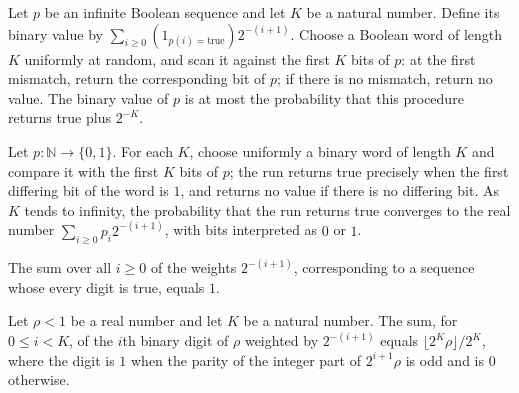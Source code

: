 \begin{theorem}
\label{Randomized.binVal_le_randProb_rhoCoinRun_add}
\leanok
{}
Let $p$ be an infinite Boolean sequence and let $K$ be a natural number. Define its
binary value by $\sum_{i\ge0}(1_{p(i)=\mathrm{true}})2^{-(i+1)}$. Choose a Boolean word
of length $K$ uniformly at random, and scan it against the first $K$ bits of $p$: at the
first mismatch, return the corresponding bit of $p$; if there is no mismatch, return no
value. The binary value of $p$ is at most the probability that this procedure returns
true plus $2^{-K}$.
\end{theorem}

\begin{theorem}
\label{Randomized.tendsto_randProb_rhoCoinRun}
\leanok
{}
Let $p:\mathbb{N}\to\{0,1\}$. For each $K$, choose uniformly a binary word of length $K$
and compare it with the first $K$ bits of $p$; the run returns true precisely when the
first differing bit of the word is $1$, and returns no value if there is no differing
bit. As $K$ tends to infinity, the probability that the run returns true converges to
the real number $\sum_{i\ge 0}p_i2^{-(i+1)}$, with bits interpreted as $0$ or $1$.
\end{theorem}

\begin{theorem}
\label{Randomized.binVal_const_true}
\leanok
{}
The sum over all $i\ge0$ of the weights $2^{-(i+1)}$, corresponding to a sequence whose
every digit is true, equals $1$.
\end{theorem}

\begin{theorem}
\label{Randomized.sum_binDigit}
\leanok
{}
Let $\rho<1$ be a real number and let $K$ be a natural number. The sum, for $0\le i<K$,
of the $i$th binary digit of $\rho$ weighted by $2^{-(i+1)}$ equals $\lfloor
2^K\rho\rfloor/2^K$, where the digit is $1$ when the parity of the integer part of
$2^{i+1}\rho$ is odd and is $0$ otherwise.
\end{theorem}

